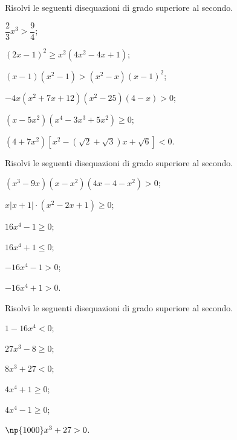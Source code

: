 \begin{esercizio}[\Ast]
 \label{ese:4.46}
Risolvi le seguenti disequazioni di grado superiore al secondo.
\begin{enumeratea}
\item $\dfrac 2 3x^3>\dfrac 9 4$;
\item $ (2x-1)^2\ge x^2\left(4x^2-4x+1\right) $;
\item $ (x-1)\left(x^2-1\right)>\left(x^2-x\right)(x-1)^2 $;
\item $ -4x\left(x^2+7x+12\right)\left(x^2-25\right)(4-x)>0 $;
\item $ (x-5x^2)(x^4-3x^3+5x^2)\ge 0 $;
\item $ (4+7x^2)\left[x^2-(\sqrt 2+\sqrt 3)x+\sqrt 6\right]<0 $.
\end{enumeratea}
\end{esercizio}
\begin{esercizio}[\Ast]
 \label{ese:4.47}
Risolvi le seguenti disequazioni di grado superiore al secondo.
\begin{multicols}{2}
\begin{enumeratea}
\item $ (x^3-9x)(x-x^2)(4x-4-x^2)>0 $;
\item $ x\left|x+1\right|\cdot (x^2-2x+1)\ge 0 $;
\item $16x^4-1\ge 0$;
\item $16x^4+1\le 0$;
\item $-16x^4-1>0$;
\item $-16x^4+1>0$.
\end{enumeratea}
\end{multicols}
\end{esercizio}
\pagebreak
\begin{esercizio}[\Ast]
 \label{ese:4.48}
Risolvi le seguenti disequazioni di grado superiore al secondo.
\begin{multicols}{3}
\begin{enumeratea}
\item $1-16x^4<0$;
\item $27x^3-8\ge 0$;
\item $8x^3+27<0$;
\item $4x^4+1\ge 0$;
\item $4x^4-1\ge 0$;
\item $\np{1000}x^3+27>0$.
\end{enumeratea}
\end{multicols}
\end{esercizio}

